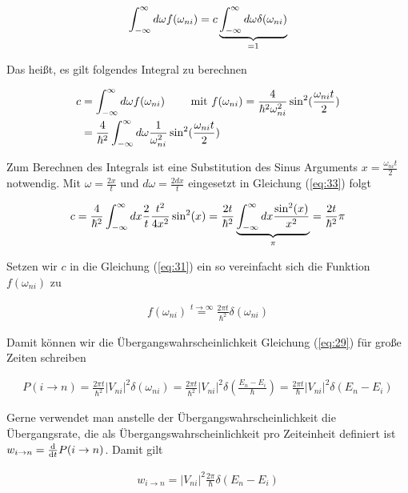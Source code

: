 \begin{align}
  \label{eq:32}
  \int_{-\infty}^\infty d\omega f(\omega_{ni}) = c \underbr{ \int_{-\infty}^\infty d\omega \delta(\omega_{ni}) }_{=1}
\end{align}

Das heißt, es gilt folgendes Integral zu berechnen

\begin{align}
  \label{eq:33}
  c &= \int_{-\infty}^\infty d\omega f(\omega_{ni}) \qquad \text{ mit } f(\omega_{ni})=\frac{4}{\hbar^2\omega_{ni}^2}\sin^2(\frac{\omega_{ni} t}{2}) \notag\\
&=\frac{4}{\hbar^2} \int_{-\infty}^\infty d\omega \frac{1}{\omega_{ni}^2}\sin^2(\frac{\omega_{ni} t}{2})
\end{align}

Zum Berechnen des Integrals ist eine Substitution des Sinus Arguments \(x= \frac{\omega_{ni} t}{2}\)  notwendig. Mit \(\omega = \frac{2x}{t} \) und \(d\omega = \frac{2dx}{t}\) eingesetzt in Gleichung (\ref{eq:33}) folgt

\begin{align}
  \label{eq:34}
  c = \frac{4}{\hbar^2} \int_{-\infty}^\infty dx \frac{2}{t} \frac{t^2}{4x^2}\sin^2(x) = \frac{2t}{\hbar^2} \underbr{\int_{-\infty}^\infty dx \frac{\sin^2(x)}{x^2}}_{\pi} = \frac{2t}{\hbar^2} \pi
\end{align}

Setzen wir \(c\) in die Gleichung (\ref{eq:31}) ein so vereinfacht sich die Funktion \(f(\omega_{ni})\) zu

\begin{align}
  \label{eq:35}
  f(\omega_{ni}) \stackrel{t \to \infty}= \frac{2\pi t}{\hbar^2} \delta(\omega_{ni})
\end{align}

Damit können wir die Übergangswahrscheinlichkeit Gleichung (\ref{eq:29}) für große Zeiten schreiben

\begin{align}
  \label{eq:36}
   P(i\rightarrow n) = \frac{2\pi t}{\hbar^2} |V_{ni}|^2  \delta(\omega_{ni}) = \frac{2\pi t}{\hbar^2} |V_{ni}|^2  \delta(\frac{E_n-E_i}{\hbar}) = \frac{2\pi t}{\hbar} |V_{ni}|^2  \delta(E_n-E_i)
\end{align}

Gerne verwendet man anstelle der Übergangswahrscheinlichkeit die Übergangsrate, die als Übergangswahrscheinlichkeit pro Zeiteinheit definiert ist \(w_{i\to n}= \diff_t P(i\rightarrow n)\). Damit gilt

\begin{align}
  \label{eq:37}
\boxed{  w_{i\to n}= |V_{ni}|^2 \frac{2\pi}{\hbar} \delta(E_n-E_i) }
\end{align}

